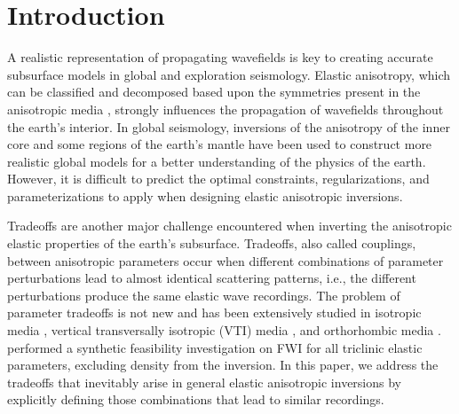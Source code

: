 \section{Introduction}
A realistic representation of propagating wavefields is key to creating accurate subsurface 
models in global and exploration seismology.
%
Elastic anisotropy, which can be classified and decomposed based upon the symmetries present in the anisotropic media \citep{browaeys2004,bona2007}, strongly influences the propagation of wavefields throughout the earth's interior.
%
In global seismology, inversions of the anisotropy of the inner core 
\citep{tromp1993support,creager1999large} and some regions of the earth's 
mantle \citep[e.g.,][]{long2010mantle,bozdag2016} have been used to construct more realistic 
global models for a better understanding of the physics of the earth. However, it is difficult to predict the optimal constraints, regularizations, and parameterizations to apply when designing elastic anisotropic inversions.

Tradeoffs are another major challenge encountered when inverting the anisotropic elastic 
properties of the earth's subsurface. Tradeoffs, also called couplings, between anisotropic parameters occur when different combinations of parameter perturbations lead to almost identical scattering patterns, i.e., the different perturbations produce the same elastic wave recordings. The problem of parameter tradeoffs is not new and has been  
extensively studied in isotropic media 
\citep{wu1985,tarantola1986,virieux2009,kohn2012,anikiev2014m,vegard2017}, vertical transversally isotropic (VTI) media \citep{eaton1994,gholami20131,alkhalifah2014,plessix2016}, and 
orthorhombic media \citep{hoop1999,shaw2004,juwon2016,kazei2017}. %
\cite{kohn2015} performed a synthetic feasibility investigation on FWI for all triclinic elastic parameters, excluding density from the inversion.  
In this paper, we address the tradeoffs that inevitably arise in general elastic anisotropic inversions by explicitly defining those combinations that lead to similar recordings.
%

